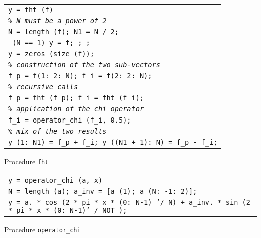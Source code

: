 \begin{listing} \begin{footnotesize}
 
 
\noindent
{\upshape
\begin{tabular}{l} \texttt{\pfunction y = fht (f)} \\
\texttt{\textit{\% N must be a power of 2}} \\
\texttt{N = length (f); N1 = N / 2;} \\
\texttt{\pif{} (N == 1) y = f; \preturn{}; \pend{};} \\
\texttt{y = zeros (size (f));} \\
\texttt{\textit{\% construction of the two sub-vectors}} \\
\texttt{f\_p = f(1: 2: N); f\_i = f(2: 2: N);} \\
\texttt{\textit{\% recursive calls}} \\
\texttt{f\_p = fht (f\_p); f\_i = fht (f\_i);} \\
\texttt{\textit{\% application of the chi operator}} \\
\texttt{f\_i = operator\_chi (f\_i, 0.5);} \\
\texttt{\textit{\% mix of the two results}} \\
\texttt{y (1: N1) = f\_p + f\_i; y ((N1 + 1): N) = f\_p - f\_i;} \\
\end{tabular}
}
 
\noindent \end{footnotesize}
 
\caption{Procedure \texttt{\upshape fht}}
 
\label{listing-fht}
\end{listing}
 
\begin{listing} \begin{footnotesize}
 
 
\noindent
{\upshape
\begin{tabular}{l} \texttt{\pfunction y = operator\_chi (a, x)} \\
\texttt{N = length (a); a\_inv = [a (1); a (N: -1: 2)];} \\
\texttt{y = a. * cos (2 * pi * x * (0: N-1) '/ N) + a\_inv. * sin (2 * pi * x * (0: N-1)' / NOT );}\\
\end{tabular}
}
 
\noindent \end{footnotesize}
 
\caption{Procedure \texttt{\upshape operator\_chi}}
 
\label{listing-operator_chi}
\end{listing}
 

